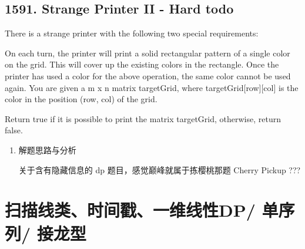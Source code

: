 \documentclass[9pt, b5paaper]{book}
\begin{document}
\subsection{1591. Strange Printer II - Hard todo}
\label{sec-1-3-7}
There is a strange printer with the following two special requirements:

On each turn, the printer will print a solid rectangular pattern of a single color on the grid. This will cover up the existing colors in the rectangle.
Once the printer has used a color for the above operation, the same color cannot be used again.
You are given a m x n matrix targetGrid, where targetGrid[row][col] is the color in the position (row, col) of the grid.

Return true if it is possible to print the matrix targetGrid, otherwise, return false.
\begin{enumerate}
\item 解题思路与分析
\label{sec-1-3-7-1}

关于含有隐藏信息的 dp 题目，感觉巅峰就属于拣樱桃那题 Cherry Pickup ???
\end{enumerate}

\section{扫描线类、时间戳、一维线性DP/ 单序列/ 接龙型}
\label{sec-1-4}
\end{document}
